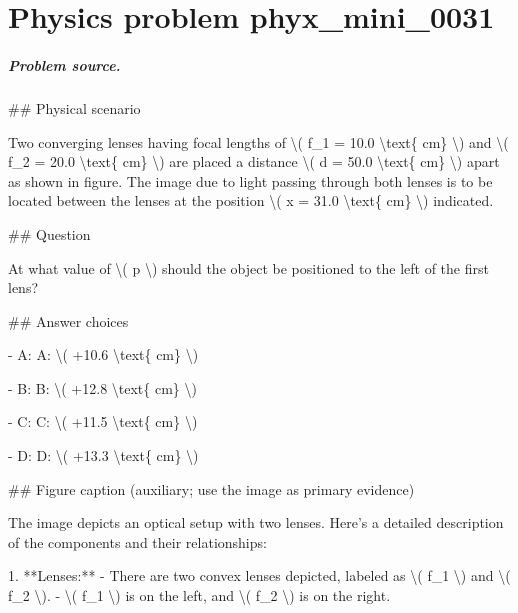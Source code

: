 
\chapter{Physics problem phyx\_mini\_0031}
\label{ch:PhyXMiniProblems_problem_phyx_mini_0031}

\paragraph{Problem source.}
\#\# Physical scenario

Two converging lenses having focal lengths of \textbackslash{}( f\_1 = 10.0 \textbackslash{}text\{ cm\} \textbackslash{}) and \textbackslash{}( f\_2 = 20.0 \textbackslash{}text\{ cm\} \textbackslash{}) are placed a distance \textbackslash{}( d = 50.0 \textbackslash{}text\{ cm\} \textbackslash{}) apart as shown in figure. The image due to light passing through both lenses is to be located between the lenses at the position \textbackslash{}( x = 31.0 \textbackslash{}text\{ cm\} \textbackslash{}) indicated.

\#\# Question

At what value of \textbackslash{}( p \textbackslash{}) should the object be positioned to the left of the first lens?

\#\# Answer choices

- A: A: \textbackslash{}( +10.6 \textbackslash{}text\{ cm\} \textbackslash{})

- B: B: \textbackslash{}( +12.8 \textbackslash{}text\{ cm\} \textbackslash{})

- C: C: \textbackslash{}( +11.5 \textbackslash{}text\{ cm\} \textbackslash{})

- D: D: \textbackslash{}( +13.3 \textbackslash{}text\{ cm\} \textbackslash{})

\#\# Figure caption (auxiliary; use the image as primary evidence)

The image depicts an optical setup with two lenses. Here's a detailed description of the components and their relationships:

1. **Lenses:**
   - There are two convex lenses depicted, labeled as \textbackslash{}( f\_1 \textbackslash{}) and \textbackslash{}( f\_2 \textbackslash{}).
   - \textbackslash{}( f\_1 \textbackslash{}) is on the left, and \textbackslash{}( f\_2 \textbackslash{}) is on the right.

